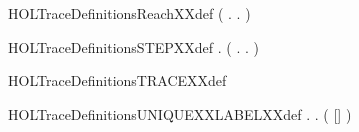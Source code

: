 \newcommand{\HOLTraceDefinitionsNODESXXdef}{\UseVerbatim{HOLTraceDefinitionsNODESXXdef}}
\begin{SaveVerbatim}{HOLTraceDefinitionsReachXXdef}
\HOLTokenTurnstile{}  \HOLSymConst{=} (\HOLTokenLambda{} . \HOLSymConst{\HOLTokenExists{}}.  \HOLTokenTransBegin{}\HOLTokenTransEnd {})\HOLSymConst{\HOLTokenSupStar{}}
\end{SaveVerbatim}
\newcommand{\HOLTraceDefinitionsReachXXdef}{\UseVerbatim{HOLTraceDefinitionsReachXXdef}}
\begin{SaveVerbatim}{HOLTraceDefinitionsSTEPXXdef}
\HOLTokenTurnstile{} \HOLSymConst{\HOLTokenForall{}}  .     \HOLSymConst{\HOLTokenEquiv{}}  (\HOLTokenLambda{} . \HOLSymConst{\HOLTokenExists{}}.  \HOLTokenTransBegin{}\HOLTokenTransEnd {})   
\end{SaveVerbatim}
\newcommand{\HOLTraceDefinitionsSTEPXXdef}{\UseVerbatim{HOLTraceDefinitionsSTEPXXdef}}
\begin{SaveVerbatim}{HOLTraceDefinitionsTRACEXXdef}
\HOLTokenTurnstile{}  \HOLSymConst{=}  
\end{SaveVerbatim}
\newcommand{\HOLTraceDefinitionsTRACEXXdef}{\UseVerbatim{HOLTraceDefinitionsTRACEXXdef}}
\begin{SaveVerbatim}{HOLTraceDefinitionsUNIQUEXXLABELXXdef}
\HOLTokenTurnstile{} \HOLSymConst{\HOLTokenForall{}} .
          \HOLSymConst{\HOLTokenEquiv{}}
       \HOLSymConst{\HOLTokenExists{}} . ( \HOLSymConst{++} [] \HOLSymConst{++}  \HOLSymConst{=} ) \HOLSymConst{\HOLTokenConj{}}   \HOLSymConst{\HOLTokenConj{}}  
\end{SaveVerbatim}
\newcommand{\HOLTraceDefinitionsUNIQUEXXLABELXXdef}{\UseVerbatim{HOLTraceDefinitionsUNIQUEXXLABELXXdef}}
\newcommand{\HOLTraceDefinitions}{
\HOLDfnTag{Trace}{finite_state_def}\HOLTraceDefinitionsfiniteXXstateXXdef
\HOLDfnTag{Trace}{LRTC_DEF}\HOLTraceDefinitionsLRTCXXDEF
\HOLDfnTag{Trace}{NO_LABEL_def}\HOLTraceDefinitionsNOXXLABELXXdef
\HOLDfnTag{Trace}{NODES_def}\HOLTraceDefinitionsNODESXXdef
\HOLDfnTag{Trace}{Reach_def}\HOLTraceDefinitionsReachXXdef
\HOLDfnTag{Trace}{STEP_def}\HOLTraceDefinitionsSTEPXXdef
\HOLDfnTag{Trace}{TRACE_def}\HOLTraceDefinitionsTRACEXXdef
\HOLDfnTag{Trace}{UNIQUE_LABEL_def}\HOLTraceDefinitionsUNIQUEXXLABELXXdef
}
